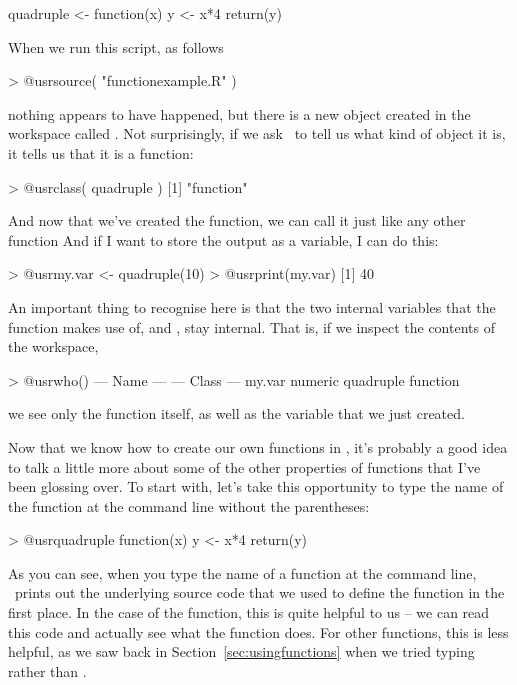 \begin{script}
quadruple <- function(x) {
  y <- x*4
  return(y)
} 
\end{script}
When we run this script, as follows
\begin{rblock1}
> @usr{source( "functionexample.R" )}
\end{rblock1}
nothing appears to have happened, but there is a new object created in the workspace called . Not surprisingly, if we ask \R\ to tell us what kind of object it is, it tells us that it is a function:
\begin{rblock1}
> @usr{class( quadruple )}
[1] "function"
\end{rblock1}
And now that we've created the  function, we can call it just like any other function 
And if I want to store the output as a variable, I can do this:
\begin{rblock1}
> @usr{my.var <- quadruple(10)}
> @usr{print(my.var)}
[1] 40
\end{rblock1}
An important thing to recognise here is that the two internal variables that the  function makes use of,  and , stay internal. That is, if we inspect the contents of the workspace, 
\begin{rblock1}
> @usr{who()}
   --- Name ---   --- Class ---
   my.var         numeric      
   quadruple      function  
\end{rblock1}
we see only the  function itself, as well as the  variable that we just created. 

Now that we know how to create our own functions in \R, it's probably a good idea to talk a little more about some of the other properties of functions that I've been glossing over. To start with, let's take this opportunity to type the name of the function at the command line without the parentheses:
\begin{rblock1}
> @usr{quadruple}
function(x) {
  y <- x*4
  return(y)
}
\end{rblock1}
As you can see, when you type the name of a function at the command line, \R\ prints out the underlying source code that we used to define the function in the first place. In the case of the  function, this is quite helpful to us -- we can read this code and actually see what the function does. For other functions, this is less helpful, as we saw back in Section~\ref{sec:usingfunctions} when we tried typing  rather than . 

